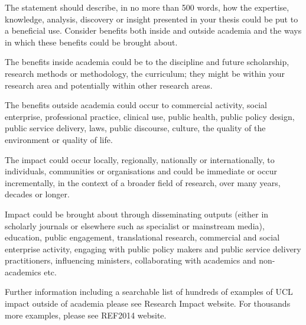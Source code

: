 {\color{lightgray}
The statement should describe, in no more than 500 words, how the expertise, knowledge, analysis,
discovery or insight presented in your thesis could be put to a beneficial use. Consider benefits both
inside and outside academia and the ways in which these benefits could be brought about.

The benefits inside academia could be to the discipline and future scholarship, research methods
or methodology, the curriculum; they might be within your research area and potentially within other
research areas.

The benefits outside academia could occur to commercial activity, social enterprise, professional
practice, clinical use, public health, public policy design, public service delivery, laws, public
discourse, culture, the quality of the environment or quality of life.

The impact could occur locally, regionally, nationally or internationally, to individuals, communities
or organisations and could be immediate or occur incrementally, in the context of a broader field of
research, over many years, decades or longer.

Impact could be brought about through disseminating outputs (either in scholarly journals or
elsewhere such as specialist or mainstream media), education, public engagement, translational
research, commercial and social enterprise activity, engaging with public policy makers and public
service delivery practitioners, influencing ministers, collaborating with academics and non-academics
etc.

Further information including a searchable list of hundreds of examples of UCL impact outside
of academia please see Research Impact website. For thousands more examples, please see
REF2014 website.
}
